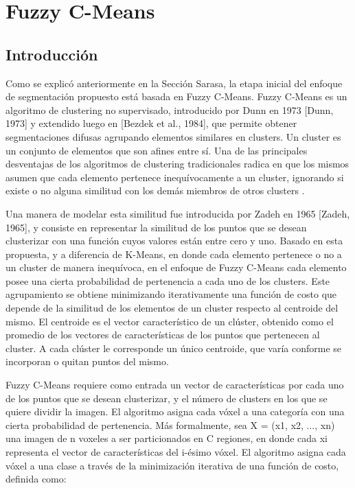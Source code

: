 \chapter{Fuzzy C-Means}
\section{Introducción}

Como se explicó anteriormente en la Sección Sarasa, la etapa inicial del enfoque de segmentación propuesto está basada en Fuzzy C-Means. Fuzzy C-Means es un algoritmo de clustering no supervisado, introducido por Dunn en 1973 [Dunn, 1973] y extendido luego en \cite{}[Bezdek et al., 1984], que permite obtener segmentaciones difusas agrupando elementos similares en clusters. Un cluster es un conjunto de elementos que son afines entre sí. Una de las principales desventajas de los algoritmos de clustering tradicionales radica en que los mismos asumen que cada elemento pertenece inequívocamente a un cluster, ignorando si existe o no alguna similitud con los demás miembros de otros clusters \citep{full1982fuzzy}.

Una manera de modelar esta similitud fue introducida por Zadeh en 1965 [Zadeh, 1965], y consiste en representar la similitud de los puntos que se desean clusterizar con una función cuyos valores están entre cero y uno. Basado en esta propuesta, y a diferencia de K-Means, en donde cada elemento pertenece o no a un cluster de manera inequívoca, en el enfoque de Fuzzy C-Means cada elemento posee una cierta probabilidad de pertenencia a cada uno de los clusters. Este agrupamiento se obtiene minimizando iterativamente una función de costo que depende de la similitud de los elementos de un cluster respecto al centroide del mismo. El centroide es el vector característico de un clúster, obtenido como el promedio de los vectores de características de los puntos que pertenecen al cluster. A cada clúster le corresponde un único centroide, que varía conforme se incorporan o quitan puntos del mismo.
 
Fuzzy C-Means requiere como entrada un vector de características por cada uno de los puntos que se desean clusterizar, y el número de clusters en los que se quiere dividir la imagen. El algoritmo asigna cada vóxel a una categoría con una cierta probabilidad de pertenencia. Más formalmente, sea X = (x1, x2, ..., xn) una imagen de n voxeles a ser particionados en C regiones, en donde cada xi representa el vector de características del i-ésimo vóxel. El algoritmo asigna cada vóxel a una clase a través de la minimización iterativa de una función de costo, definida como:

